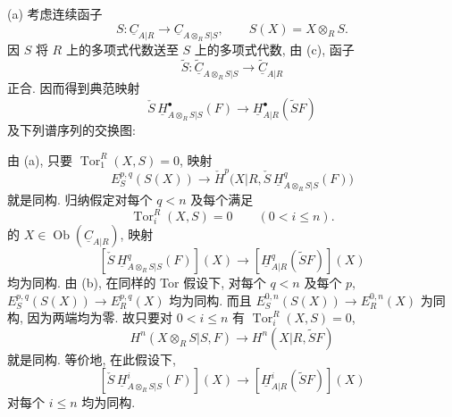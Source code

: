 (a) 考虑连续函子
\[
 S:\underline C_{A|R}\longrightarrow
 \underline C_{A\otimes_RS|S},
 \qquad S(X)=X\otimes_RS.
\]
因 $S$ 将 $R$ 上的多项式代数送至 $S$ 上的多项式代数,
由 (c), 函子
\[
 \widetilde S:\widetilde{\underline C}_{A\otimes_RS|S}
 \longrightarrow\widetilde{\underline C}_{A|R}
\]
正合. 因而得到典范映射
\[
 \check S\,\underline H^{\bullet}_{A\otimes_RS|S}(F)
 \longrightarrow
 \underline H^{\bullet}_{A|R}(\widetilde SF)
\]
及下列谱序列的交换图:
\begin{center}
\small
{}
\end{center}


由 (a), 只要
$\operatorname{Tor}_1^R(X,S)=0$, 映射
\[
 E_S^{p,q}(S(X))\longrightarrow
 \check H^p\bigl(X|R,
 \check S\,\underline H^q_{A\otimes_RS|S}(F)\bigr)
\]
就是同构. 归纳假定对每个 $q<n$ 及每个满足
\[
 \operatorname{Tor}_i^R(X,S)=0\qquad(0<i\leq n).
\]
的 $X\in\operatorname{Ob}(\underline C_{A|R})$, 映射
\[
 [\check S\,\underline H^q_{A\otimes_RS|S}(F)](X)
 \longrightarrow
 [\underline H^q_{A|R}(\widetilde SF)](X)
\]
均为同构. 由 (b),
在同样的 Tor 假设下, 对每个 $q<n$ 及每个 $p$,
$E_S^{p,q}(S(X))\longrightarrow E_R^{p,q}(X)$ 均为同构.
而且 $E_S^{0,n}(S(X))\longrightarrow E_R^{0,n}(X)$ 为同构,
因为两端均为零. 故只要对 $0<i\leq n$ 有 $\operatorname{Tor}_i^R(X,S)=0$,
\[
 H^n(X\otimes_RS|S,F)
 \longrightarrow H^n(X|R,\widetilde SF)
\]
就是同构. 等价地, 在此假设下,
\[
 [\check S\,\underline H^i_{A\otimes_RS|S}(F)](X)
 \longrightarrow
 [\underline H^i_{A|R}(\widetilde SF)](X)
\]
对每个 $i\leq n$ 均为同构.

